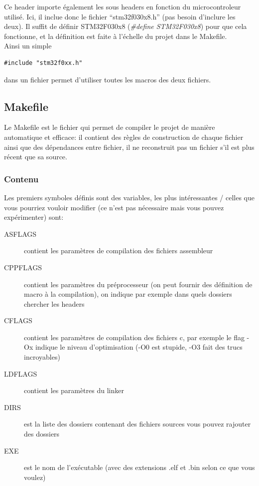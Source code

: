 \documentclass[a4paper,10pt]{article} %
\begin{document}
\begin{description}
Ce header importe également les sous headers en fonction du microcontroleur utilisé. Ici, il inclue donc le fichier ``stm32f030x8.h'' (pas besoin d'inclure les deux). Il suffit de définir STM32F030x8 (\textit{\#define STM32F030x8}) pour que cela fonctionne, et la définition est faite à l'échelle du projet dans le Makefile.\\

Ainsi un simple
\begin{lstlisting}[frame=none]
#include "stm32f0xx.h"
\end{lstlisting}
dans un fichier permet d'utiliser toutes les macros des deux fichiers.
\end{description}

\subsection{Makefile}
Le Makefile est le fichier qui permet de compiler le projet de manière automatique et efficace: il contient des règles de construction de chaque fichier ainsi que des dépendances entre fichier, il ne reconstruit pas un fichier s'il est plus récent que sa source.

\subsubsection{Contenu}
Les premiers symboles définis sont des variables, les plus intéressantes / celles que vous pourriez vouloir modifier (ce n'est pas nécessaire mais vous pouvez expérimenter) sont:
\begin{description}
    \item[ASFLAGS] contient les paramètres de compilation des fichiers assembleur
    \item[CPPFLAGS] contient les paramètres du préprocesseur (on peut fournir des définition de macro à la compilation), on indique par exemple dans quels dossiers chercher les headers
    \item[CFLAGS] contient les paramètres de compilation des fichiers c, par exemple le flag -Ox indique le niveau d'optimisation (-O0 est stupide, -O3 fait des trucs incroyables)
    \item[LDFLAGS] contient les paramètres du linker
    \item[DIRS] est la liste des dossiers contenant des fichiers sources vous pouvez rajouter des dossiers
    \item[EXE] est le nom de l’exécutable (avec des extensions .elf et .bin selon ce que vous voulez)
\end{description}
\end{document}
